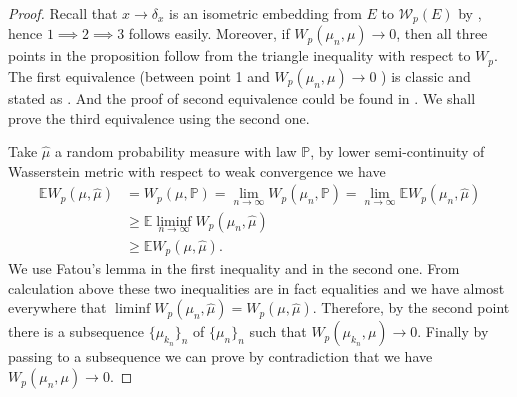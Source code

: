 \begin{proof}
	Recall that $x \rightarrow \delta_x$ is an isometric embedding from $E$ to $\mathcal{W}_p(E)$
	by ,
	hence $1 \implies 2 \implies 3$ follows easily.
	Moreover, if $W_p(\mu_n, \mu) \rightarrow 0$,
	then all three points in the proposition follow from the triangle inequality with respect to $W_p$.
	The first equivalence (between point 1 and $W_p(\mu_n, \mu) \rightarrow 0$ ) is classic and stated as .
	And the proof of second equivalence could be found in \cite[Lemma 14]{le2017existence}.
	We shall prove the third equivalence using the second one.

	Take $\hat{\mu}$ a random probability measure with law $\mathbb{P}$,
	by lower semi-continuity of Wasserstein metric with respect to weak convergence we have
	\begin{align*}
		\mathbb{E}W_p(\mu, \hat{\mu}) & =W_p(\mu, \mathbb{P})=\lim_{n \rightarrow \infty} W_p(\mu_n, \mathbb{P})
		= \lim_{n \rightarrow \infty} \mathbb{E} W_p(\mu_n, \hat{\mu})                                           \\
		                              & \geq \mathbb{E}\liminf_{n \rightarrow \infty} W_p(\mu_n, \hat{\mu})      \\
		                              & \geq \mathbb{E}W_p(\mu, \hat{\mu}).
	\end{align*}
	We use Fatou's lemma in the first inequality and
	 in the second one.
	From calculation above these two inequalities are in fact equalities and
	we have almost everywhere that $\liminf W_p(\mu_n, \hat{\mu})=W_p(\mu, \hat{\mu})$.
	Therefore, by the second point there is a subsequence $\{\mu_{k_n}\}_n$ of $\{\mu_n\}_n$
	such that $W_p(\mu_{k_n}, \mu) \rightarrow 0$.
	Finally by passing to a subsequence we can prove by contradiction
	that we have $W_p(\mu_n, \mu) \rightarrow 0$.
\end{proof}

